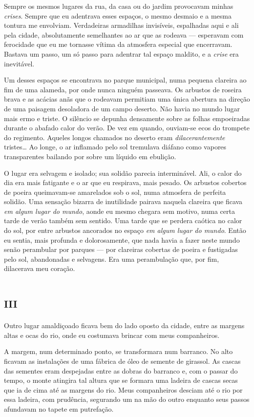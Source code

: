 Sempre os mesmos lugares da rua, da casa ou do jardim provocavam minhas \textit{crises}. Sempre que eu adentrava esses espaços, o mesmo desmaio e a mesma tontura me envolviam. Verdadeiras armadilhas invisíveis, espalhadas aqui e ali pela cidade, absolutamente semelhantes ao ar que as rodeava --- esperavam com ferocidade que eu me tornasse vítima da atmosfera especial que encerravam. Bastava um passo, um só passo para adentrar tal espaço maldito, e a \textit{crise} era inevitável.

Um desses espaços se encontrava no parque municipal, numa pequena clareira ao fim de uma alameda, por onde nunca ninguém passeava. Os arbustos de roseira brava e as acácias anãs que o rodeavam permitiam uma única abertura na direção de uma paisagem desoladora de um campo deserto. Não havia no mundo lugar mais ermo e triste. O silêncio se depunha densamente sobre as folhas empoeiradas durante o abafado calor do verão. De vez em quando, ouviam-se ecos do trompete do regimento. Aqueles longos chamados no deserto eram \textit{dilacerantemente} tristes\ldots{} Ao longe, o ar inflamado pelo sol tremulava diáfano como vapores transparentes bailando por sobre um líquido em ebulição.

O lugar era selvagem e isolado; sua solidão parecia interminável. Ali, o calor do dia era mais fatigante e o ar que eu respirava, mais pesado. Os arbustos cobertos de poeira queimavam-se amarelados sob o sol, numa atmosfera de perfeita solidão. Uma sensação bizarra de inutilidade pairava naquela clareira que ficava \textit{em algum lugar do mundo}, aonde eu mesmo chegara sem motivo, numa certa tarde de verão também sem sentido. Uma tarde que se perdera caótica no calor do sol, por entre arbustos ancorados no espaço \textit{em algum lugar do mundo}. Então eu sentia, mais profunda e dolorosamente, que nada havia a fazer neste mundo senão perambular por parques --- por clareiras cobertas de poeira e fustigadas pelo sol, abandonadas e selvagens. Era uma perambulação que, por fim, dilacerava meu coração.


\chapter*{\huge\centering\textsc{iii}}

Outro lugar amaldiçoado ficava bem do lado oposto da cidade, entre as margens altas e ocas do rio, onde eu costumava brincar com meus companheiros.

A margem, num determinado ponto, se transformara num barranco. No alto ficavam as instalações de uma fábrica de óleo de semente de girassol. As cascas das sementes eram despejadas entre as dobras do barranco e, com o passar do tempo, o monte atingira tal altura que se formara uma ladeira de cascas secas que ia de cima até as margens do rio.
Meus companheiros desciam até o rio por essa ladeira, com prudência, segurando um na mão do outro enquanto seus passos afundavam no tapete em putrefação.

